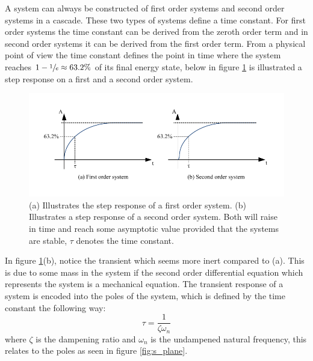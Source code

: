A system can always be constructed of first order systems and second order systems in a cascade. These two types of systems define a time constant. For first order systems the time constant can be derived from the zeroth order term and in second order systems it can be derived from the first order term. From a physical point of view the time constant defines the point in time where the system reaches $1 - \sfrac{1}{e} \approx 63.2\%$ of its final energy state, below in figure \ref{fig:energy_systems} is illustrated a step response on a first and a second order system.
\begin{figure}[htb]
	\centering
	\includegraphics[scale=1,trim=0 0 0 0]{graphics/energy_systems.pdf} %
	\caption{(a) Illustrates the step response of a first order system. (b) Illustrates a step response of a second order system. Both will raise in time and reach some asymptotic value provided that the systems are stable, $\tau$ denotes the time constant.}
	\label{fig:energy_systems}			%
\end{figure}
In figure \ref{fig:energy_systems}(b), notice the transient which seems more inert compared to (a). This is due to some mass in the system if the second order differential equation which represents the system is a mechanical equation. The transient response of a system is encoded into the poles of the system, which is defined by the time constant the following way:
\begin{equation}
	\tau = \frac{1}{\zeta\omega_{n}}\label{eq:time_constant}
\end{equation}
where $\zeta$ is the dampening ratio and $\omega_{n}$ is the undampened natural frequency, this relates to the poles as seen in figure \ref{fig:s_plane}.
